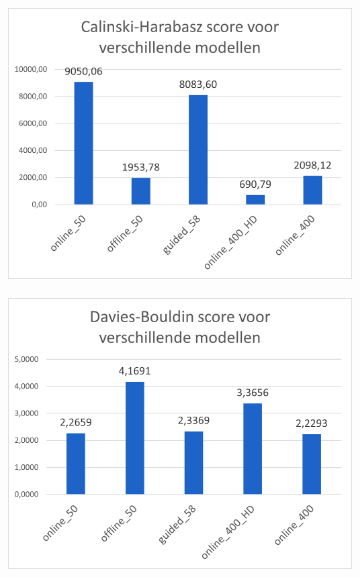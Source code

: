 \begin{figure}[H]
    \begin{subfigure}{.5\textwidth}
        \centering
        \includegraphics[width=1\linewidth]{fig/chapt4/NLP/cal_model.png}
    \end{subfigure}
    \begin{subfigure}{.5\textwidth}
        \centering
        \includegraphics[width=1\linewidth]{fig/chapt4/NLP/davies_model.png}
    \end{subfigure}
    

\end{figure}
